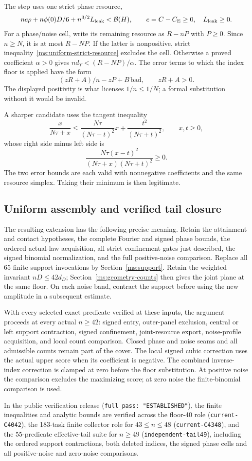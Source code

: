 The step uses one strict phase resource,
\begin{equation}\label{ms:uniform-strict-resource}
 ne\rho+n\phi(0)D/6+n^{3/2}L_{\rm leak}<\mathcal B(H),
 \qquad e=C-C_{\mathrm E}\ge0,\quad L_{\rm leak}\ge0.
\end{equation}
For a phase/noise cell, write its remaining resource as $R-nP$ with
$P\ge0$. Since $n\ge N$, it is at most $R-NP$. If the latter is
nonpositive, strict inequality~\eqref{ms:uniform-strict-resource}
excludes the cell. Otherwise a proved coefficient $\alpha>0$ gives
$nd_Y<(R-NP)/\alpha$. The error terms to which the index floor is
applied have the form
\[
 (zR+A)/n-zP+B\,\mathrm{bad},\qquad zR+A>0.
\]
The displayed positivity is what licenses $1/n\le1/N$; a formal
substitution without it would be invalid.

A sharper candidate uses the tangent inequality
\[
 \frac{x}{N\tau+x}\le
 \frac{N\tau}{(N\tau+t)^2}x+
 \frac{t^2}{(N\tau+t)^2},\qquad x,t\ge0,
\]
whose right side minus left side is
\[
 \frac{N\tau(x-t)^2}{(N\tau+x)(N\tau+t)^2}\ge0.
\]
The two error bounds are each valid with nonnegative coefficients and
the same resource simplex. Taking their minimum is then legitimate.

\subsection{Uniform assembly and verified tail closure}

The resulting extension has the following precise meaning. Retain the
attainment and contact hypotheses, the complete Fourier and signed
phase bounds, the ordered actual-law acquisition, all strict confinement
gates just described, the signed binomial normalization, and the full
positive-noise comparison. Replace all 65 finite support invocations
by Section~\ref{ms:support}. Retain the weighted invariant $nD\le42d_D$;
Section~\ref{ms:geometry-counts} then gives the joint plane at the same
floor. On each noise band, contract the support before using the new
amplitude in a subsequent estimate.

With every selected exact predicate verified at these inputs, the argument
proceeds at every actual $n\ge42$: signed entry, outer-panel exclusion,
central or left support contraction, signed confinement, joint-resource
export, noise-profile acquisition, and local count comparison. Closed
phase and noise seams and all admissible counts remain part of the
cover. The local signed cubic correction uses the actual upper score
when its coefficient is negative. The combined inverse-index correction
is clamped at zero before the floor substitution. At positive noise the comparison excludes the maximizing score; at zero
noise the finite-binomial comparison is used.

In the public verification release (\texttt{full\_pass: "ESTABLISHED"}), the
finite inequalities and analytic bounds are verified across the floor-40 role
(\texttt{current-C4042}), the 183-task finite collector role for $43\le n\le48$
(\texttt{current-C4348}), and the 55-predicate effective-tail suite for
$n\ge49$ (\texttt{independent-tail49}), including the ordered support
contractions, both deleted indices, the signed phase cells and all
positive-noise and zero-noise comparisons.
